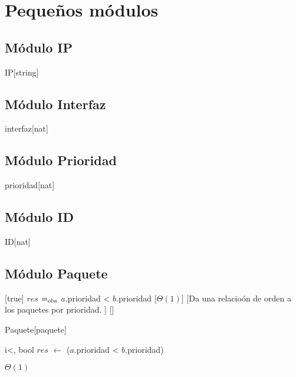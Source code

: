 \section{Peque\~nos m\'odulos}

\subsection{M\'{o}dulo IP}
    \begin{Estructura}{IP}[string]
    \end{Estructura} 

\subsection{M\'{o}dulo Interfaz}
    \begin{Estructura}{interfaz}[nat]
    \end{Estructura} 

\subsection{M\'{o}dulo Prioridad}
    \begin{Estructura}{prioridad}[nat]
    \end{Estructura} 

\subsection{M\'{o}dulo ID}
    \begin{Estructura}{ID}[nat]
    \end{Estructura} 

\subsection{M\'{o}dulo Paquete}
    [true]%
    {$res$ $=_{\mathrm{obs}}$ $a$.prioridad < $b$.prioridad}%
    [$\Theta(1)$]%
    [Da una relacio\'on de orden a los paquetes por prioridad. ]%
    []%
    \begin{Estructura}{Paquete}[paquete]
      \begin{Tupla}[paquete]
      \end{Tupla}
    \end{Estructura}
  \begin{algoritmo}{i<}{, }{bool}
    $res$ $\gets$ ($a$.prioridad < $b$.prioridad)
  \end{algoritmo}
  \datosAlgoritmo{} %
  {} %
  {} %
  {$\Theta(1)$} %
  {} %

